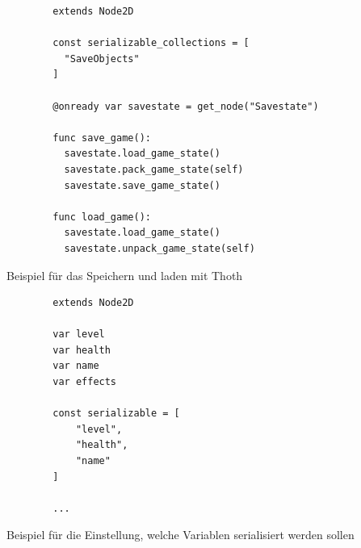 \begin{listing}[htp]
    \begin{verbatim}
        extends Node2D

        const serializable_collections = [
          "SaveObjects"
        ]

        @onready var savestate = get_node("Savestate")

        func save_game():
          savestate.load_game_state()
          savestate.pack_game_state(self)  
          savestate.save_game_state()

        func load_game():
          savestate.load_game_state()
          savestate.unpack_game_state(self)
    \end{verbatim}
    \caption{Beispiel für das Speichern und laden mit Thoth}
    \label{lst:godotThoth}
\end{listing} 

\begin{listing}[htp]
    \begin{verbatim}
        extends Node2D

        var level
        var health
        var name
        var effects

        const serializable = [
            "level",
            "health",
            "name"
        ]

        ...
    \end{verbatim}
    \caption{Beispiel für die Einstellung, welche Variablen serialisiert werden sollen}
    \label{lst:godotThothObject}
\end{listing} 